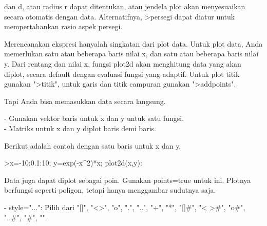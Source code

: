 \documentclass[a4paper,10pt]{article}
\begin{document}
\begin{eulernotebook}
\begin{eulercomment}
\begin{eulercomment}
\begin{eulercomment}
\begin{eulercomment}
\begin{eulercomment}
\begin{eulercomment}
\begin{eulercomment}
\begin{eulercomment}
\begin{eulercomment}
\begin{eulercomment}
\begin{eulercomment}
\begin{eulercomment}
\begin{eulercomment}
\begin{eulercomment}
\begin{eulercomment}
\begin{eulercomment}
\begin{eulercomment}
\begin{eulercomment}
\begin{eulercomment}
\begin{eulercomment}
\begin{eulercomment}
\begin{eulercomment}
\begin{eulercomment}
\begin{eulercomment}
\begin{eulercomment}
\begin{eulercomment}
\begin{eulercomment}
\begin{eulercomment}
\begin{eulercomment}
\begin{eulercomment}
\begin{eulercomment}
\begin{eulercomment}
\begin{eulercomment}
\begin{eulercomment}
\begin{eulercomment}
\begin{eulercomment}
\begin{eulercomment}
dan d, atau radius r dapat ditentukan, atau jendela plot akan
menyesuaikan secara otomatis dengan data. Alternatifnya, \textgreater{}persegi
dapat diatur untuk mempertahankan rasio aspek persegi.

Merencanakan ekspresi hanyalah singkatan dari plot data. Untuk plot
data, Anda memerlukan satu atau beberapa baris nilai x, dan satu atau
beberapa baris nilai y. Dari rentang dan nilai x, fungsi plot2d akan
menghitung data yang akan diplot, secara default dengan evaluasi
fungsi yang adaptif. Untuk plot titik gunakan "\textgreater{}titik", untuk garis
dan titik campuran gunakan "\textgreater{}addpoints".

Tapi Anda bisa memasukkan data secara langsung.

- Gunakan vektor baris untuk x dan y untuk satu fungsi.\\
- Matriks untuk x dan y diplot baris demi baris.

Berikut adalah contoh dengan satu baris untuk x dan y.
\end{eulercomment}
\begin{eulerprompt}
>x=-10:0.1:10; y=exp(-x^2)*x; plot2d(x,y):
\end{eulerprompt}
\begin{eulercomment}
Data juga dapat diplot sebagai poin. Gunakan points=true untuk ini.
Plotnya berfungsi seperti poligon, tetapi hanya menggambar sudutnya
saja.

- style="...": Pilih dari "[]", "\textless{}\textgreater{}", "o", ".", "..", "+", "*", "[]#",
"\textless{} \textgreater{}#", "o#", "..#", "#", "\textbar{}".


\end{eulercomment}
\end{eulercomment}
\end{eulercomment}
\end{eulercomment}
\end{eulercomment}
\end{eulercomment}
\end{eulercomment}
\end{eulercomment}
\end{eulercomment}
\end{eulercomment}
\end{eulercomment}
\end{eulercomment}
\end{eulercomment}
\end{eulercomment}
\end{eulercomment}
\end{eulercomment}
\end{eulercomment}
\end{eulercomment}
\end{eulercomment}
\end{eulercomment}
\end{eulercomment}
\end{eulercomment}
\end{eulercomment}
\end{eulercomment}
\end{eulercomment}
\end{eulercomment}
\end{eulercomment}
\end{eulercomment}
\end{eulercomment}
\end{eulercomment}
\end{eulercomment}
\end{eulercomment}
\end{eulercomment}
\end{eulercomment}
\end{eulercomment}
\end{eulercomment}
\end{eulercomment}
\end{eulernotebook}
\end{document}
